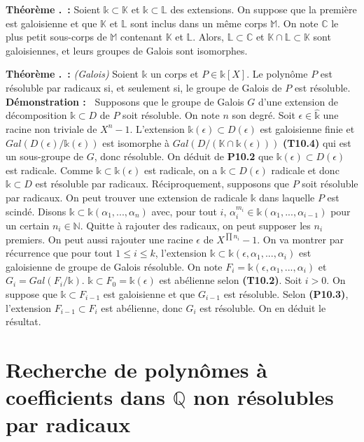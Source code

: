 \documentclass[5pt,a4paper]{article}
\newcounter{thm}[section]
\renewcommand{\thethm}{\thesection.\arabic{thm}}
\newcommand{\thm}[1]{\stepcounter{thm}\noindent\textbf{Théorème \thethm ~:} #1 \newline}
\newcommand{\demo}[1]{\textbf{Démonstration :~} #1 \newline}
\begin{document}
\begin{onehalfspacing}
\thm{Soient $\mathds{k} \subset \mathbb{K}$ et $\mathds{k} \subset \mathbb{L}$ des extensions. On suppose que la première est galoisienne et que $\mathbb{K}$ et $\mathbb{L}$ sont inclus dans un même corps $\mathbb{M}$. On note $\mathbb{C}$ le plus petit sous-corps de $\mathbb{M}$ contenant $\mathbb{K}$ et $\mathbb{L}$. Alors, $\mathbb{L} \subset \mathbb{C}$ et $\mathbb{K}\cap\mathbb{L} \subset \mathbb{K}$ sont galoisiennes, et leurs groupes de Galois sont isomorphes.}


\thm{\textit{(Galois)} Soient $\mathds{k}$ un corps et $P \in \mathds{k}[X]$. Le polynôme $P$ est résoluble par radicaux si, et seulement si, le groupe de Galois de $P$ est résoluble.}
\demo{Supposons que le groupe de Galois $G$ d'une extension de décomposition $\mathds{k} \subset D$ de $P$ soit résoluble. On note $n$ son degré. Soit $\epsilon \in \hat{\mathds{k}}$ une racine non triviale de $X^n - 1$. L'extension $\mathds{k}(\epsilon) \subset D(\epsilon)$ est galoisienne finie et $Gal(D(\epsilon)/\mathds{k}(\epsilon))$ est isomorphe à $Gal(D/(\mathbb{K}\cap\mathds{k}(\epsilon)))$ \textbf{(T10.4)} qui est un sous-groupe de $G$, donc résoluble. On déduit de \textbf{P10.2} que $\mathds{k}(\epsilon) \subset D(\epsilon)$ est radicale. Comme $\mathds{k} \subset \mathds{k}(\epsilon)$ est radicale, on a $\mathds{k} \subset D(\epsilon)$ radicale et donc $\mathds{k} \subset D$ est résoluble par radicaux. Réciproquement, supposons que $P$ soit résoluble par radicaux. On peut trouver une extension de radicale $\mathds{k}$ dans laquelle $P$ est scindé. Disons $\mathds{k} \subset \mathds{k}(\alpha_1, ..., \alpha_n)$ avec, pour tout $i$, $\alpha_i^{m_i} \in \mathds{k}(\alpha_1, ..., \alpha_{i-1})$ pour un certain $n_i \in \mathbb{N}$. Quitte à rajouter des radicaux, on peut supposer les $n_i$ premiers. On peut aussi rajouter une racine $\epsilon$ de $X^{\prod n_i} - 1$. On va montrer par récurrence que pour tout $1 \leq i \leq k$, l'extension $\mathds{k} \subset \mathds{k}(\epsilon, \alpha_1, ..., \alpha_i)$ est galoisienne de groupe de Galois résoluble. On note $F_i = \mathds{k}(\epsilon, \alpha_1, ..., \alpha_i)$ et $G_i = Gal(F_i/\mathds{k})$. $\mathds{k} \subset F_0 = \mathds{k}(\epsilon)$ est abélienne selon \textbf{(T10.2)}. Soit $i > 0$. On suppose que $\mathds{k} \subset F_{i-1}$ est galoisienne et que $G_{i-1}$ est résoluble. Selon \textbf{(P10.3)}, l'extension $F_{i-1} \subset F_i$ est abélienne, donc $G_i$ est résoluble. On en déduit le résultat.}


\newpage
\section{Recherche de polynômes à coefficients dans $\mathbb{Q}$ non résolubles par radicaux}



\end{onehalfspacing}
\end{document}

